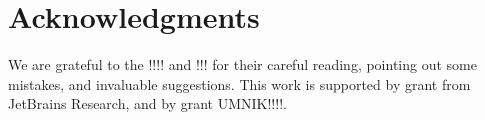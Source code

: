 \section*{Acknowledgments}

We are grateful to the !!!! and !!! for their careful reading, pointing out some mistakes, and invaluable suggestions.
This work is supported by grant from JetBrains Research, and by grant UMNIK!!!!.
